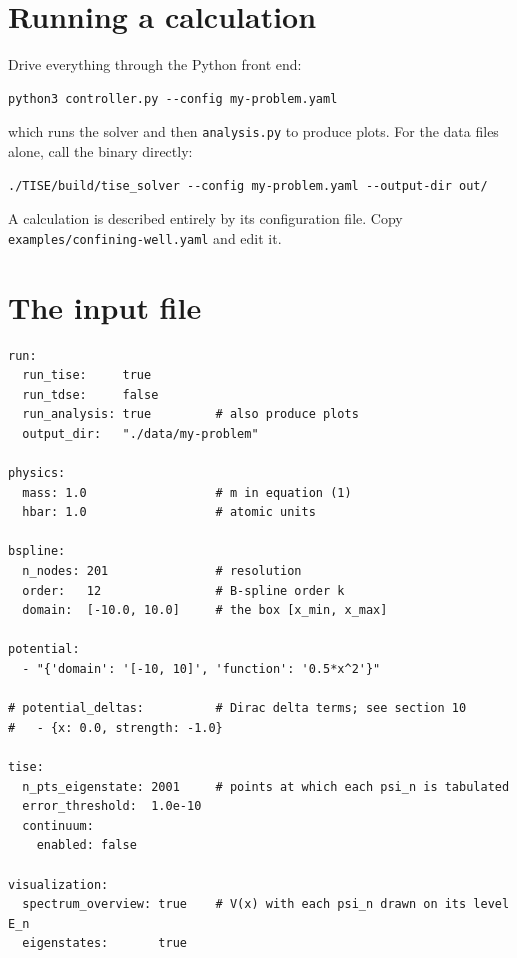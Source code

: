 \documentclass[11pt]{article}
\newcommand{\file}[1]{\texttt{#1}}
\begin{document}
\section{Running a calculation}

Drive everything through the Python front end:
\begin{lstlisting}[style=sh]
python3 controller.py --config my-problem.yaml
\end{lstlisting}
which runs the solver and then \file{analysis.py} to produce plots. For the
data files alone, call the binary directly:
\begin{lstlisting}[style=sh]
./TISE/build/tise_solver --config my-problem.yaml --output-dir out/
\end{lstlisting}

A calculation is described entirely by its configuration file. Copy
\file{examples/confining-well.yaml} and edit it.

\section{The input file}
\label{sec:input}

\begin{lstlisting}[style=yaml,caption={A complete input file.}]
run:
  run_tise:     true
  run_tdse:     false
  run_analysis: true         # also produce plots
  output_dir:   "./data/my-problem"

physics:
  mass: 1.0                  # m in equation (1)
  hbar: 1.0                  # atomic units

bspline:
  n_nodes: 201               # resolution
  order:   12                # B-spline order k
  domain:  [-10.0, 10.0]     # the box [x_min, x_max]

potential:
  - "{'domain': '[-10, 10]', 'function': '0.5*x^2'}"

# potential_deltas:          # Dirac delta terms; see section 10
#   - {x: 0.0, strength: -1.0}

tise:
  n_pts_eigenstate: 2001     # points at which each psi_n is tabulated
  error_threshold:  1.0e-10
  continuum:
    enabled: false

visualization:
  spectrum_overview: true    # V(x) with each psi_n drawn on its level E_n
  eigenstates:       true
\end{lstlisting}
\end{document}

